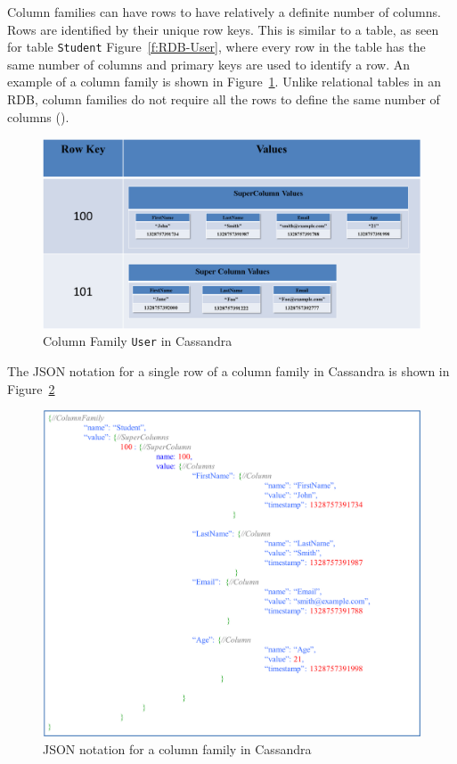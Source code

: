 \begin{description}
Column families can have rows to have relatively a definite number of columns. 
Rows are identified by their unique row keys.  This is similar to a table,   as
seen for table \texttt{Student} Figure~\ref{f:RDB-User},   where every row
in the table has the same number of columns and primary keys are used to identify a row.  An example of a column family is shown in Figure~\ref{f:columnfamilyUSER}. 
Unlike relational tables in an \ac{RDB},   column families do not require all the
rows to define the same number of columns (). 

\begin{figure}[H]
	\centering
	\includegraphics[width=.8\textwidth]{./figure/Example/ColumnFamily-User-DiffColumns.png}
	\caption{Column Family \texttt{User} in Cassandra}\label{f:columnfamilyUSER}
\end{figure}

The JSON notation for a single row of a column family in Cassandra is
shown in Figure~\ref{f:columnfamilyJSON} 

\begin{figure}[H]
	\centering
	\includegraphics[width=.8\textwidth]{./figure/Example/JSON_ColumnFamily_1row.png}
	\caption{JSON notation for a column family in
	Cassandra}\label{f:columnfamilyJSON}
\end{figure}


\end{description}
